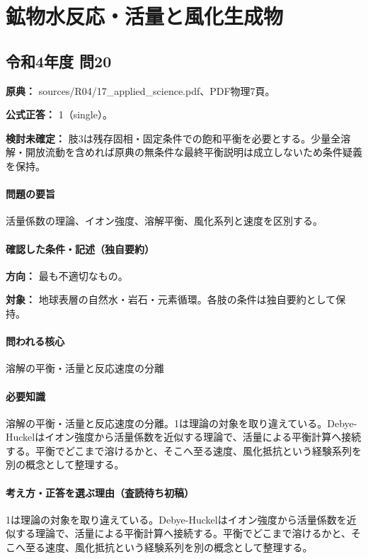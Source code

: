 \section{鉱物水反応・活量と風化生成物}

\subsection{令和4年度 問20}
\label{q:r04-reg-applied-20}

\noindent\textbf{原典：} sources/R04/17\_applied\_science.pdf、PDF物理7頁。

\textbf{公式正答：} 1（single）。

\par\textbf{検討未確定：} 肢3は残存固相・固定条件での飽和平衡を必要とする。少量全溶解・開放流動を含めれば原典の無条件な最終平衡説明は成立しないため条件疑義を保持。

\paragraph{問題の要旨} 活量係数の理論、イオン強度、溶解平衡、風化系列と速度を区別する。

\paragraph{確認した条件・記述（独自要約）}\mbox{}\par

\noindent\textbf{方向：} 最も不適切なもの。\par

\noindent\textbf{対象：} 地球表層の自然水・岩石・元素循環。各肢の条件は独自要約として保持。\par

\paragraph{問われる核心} 溶解の平衡・活量と反応速度の分離

\paragraph{必要知識} 溶解の平衡・活量と反応速度の分離。1は理論の対象を取り違えている。Debye-Huckelはイオン強度から活量係数を近似する理論で、活量による平衡計算へ接続する。平衡でどこまで溶けるかと、そこへ至る速度、風化抵抗という経験系列を別の概念として整理する。

\paragraph{考え方・正答を選ぶ理由（査読待ち初稿）} 1は理論の対象を取り違えている。Debye-Huckelはイオン強度から活量係数を近似する理論で、活量による平衡計算へ接続する。平衡でどこまで溶けるかと、そこへ至る速度、風化抵抗という経験系列を別の概念として整理する。

